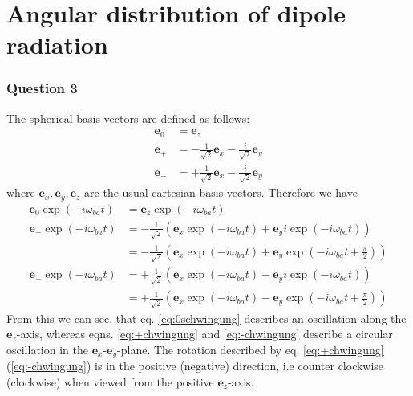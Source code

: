 \section{Angular distribution of dipole radiation }
\subsubsection{Question 3}
The spherical basis vectors are defined as follows:
\begin{align}
 \bm e_0&=\bm e_z\\
 \bm e_+ &= -\frac{1}{ \sqrt 2} \bm e_x -  \frac{i}{ \sqrt 2} \bm e_y\\
  \bm e_- &= +\frac{1}{ \sqrt 2} \bm e_x -  \frac{i}{ \sqrt 2} \bm e_y
\end{align}
where $\bm e_x ,\bm e_y, \bm e_z$ are the usual cartesian basis vectors. Therefore we have
\begin{align}
	\bm e_0 \exp(-i \omega_{ba} t)&=\bm e_z \exp(-i \omega_{ba} t) \label{eq:0schwingung}\\
	\bm e_+ \exp(-i \omega_{ba} t)&=-\frac{1}{\sqrt 2}\left(\bm e_x \exp(-i \omega_{ba} t) +\bm e_y i \exp(-i \omega_{ba} t)\right)\label{eq:+chwingung}\nonumber\\
	&=-\frac{1}{\sqrt 2}\left(\bm e_x \exp(-i \omega_{ba} t) +\bm e_y  \exp(-i \omega_{ba} t +\tfrac{\pi}{2})\right)\\
	\bm e_- \exp(-i \omega_{ba} t)&=+\frac{1}{\sqrt 2}\left(\bm e_x \exp(-i \omega_{ba} t )-\bm e_y i \exp(-i \omega_{ba} t)\right)\label{eq:-chwingung}\nonumber\\
	&=+\frac{1}{\sqrt 2}\left(\bm e_x \exp(-i \omega_{ba} t) -\bm e_y  \exp(-i \omega_{ba} t +\tfrac{\pi}{2})\right)
\end{align}
From this we can see, that eq. \eqref{eq:0schwingung} describes an oscillation along the $\bm e_z$-axis, whereas eqns. \eqref{eq:+chwingung} and \eqref{eq:-chwingung} describe a circular oscillation in the $\bm e_x$-$\bm e_y$-plane.
 The rotation described by eq. \eqref{eq:+chwingung} (\eqref{eq:-chwingung})  is in the positive (negative) direction, i.e counter clockwise (clockwise) when viewed from the positive $\bm e_z$-axis.
